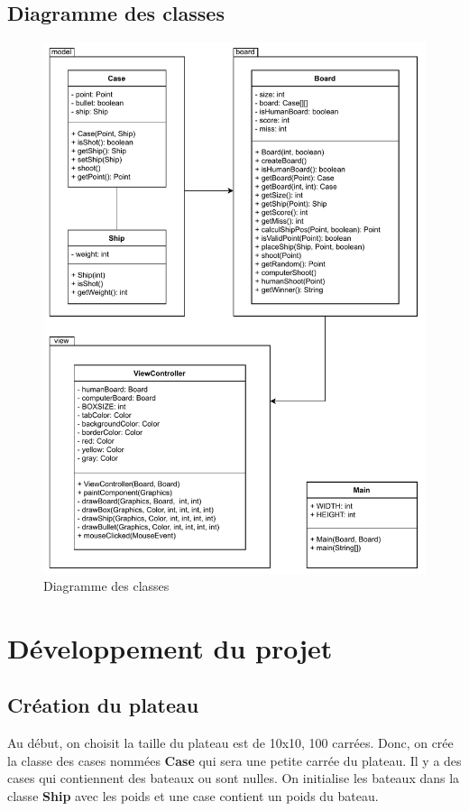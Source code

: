 \documentclass[12pt, pdflatex]{article}
\begin{document}
    \subsection{Diagramme des classes}
    \begin{figure}[H]
        \centering
        \includegraphics[width=1\textwidth]{sources/uml.pdf}
        \caption{Diagramme des classes}
    \end{figure}



\section{Développement du projet}

    \subsection{Création du plateau}
    Au début, on choisit la taille du plateau est de 10x10, 100 carrées. Donc, on crée la classe des cases nommées \textbf{Case} qui sera une petite carrée du plateau. Il y a des cases qui contiennent des bateaux ou sont nulles. On initialise les bateaux dans la classe \textbf{Ship} avec les poids et une case contient un poids du bateau.
    
\end{document}
